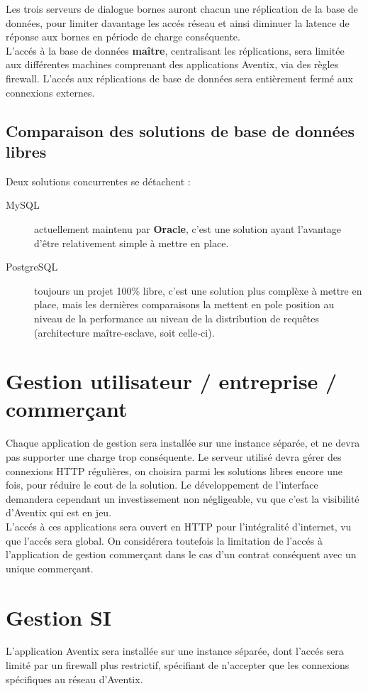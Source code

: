 Les trois serveurs de dialogue bornes auront chacun une réplication de la base
de données, pour limiter davantage les accés réseau et ainsi diminuer la
latence de réponse aux bornes en période de charge conséquente. \\

L'accés à la base de données \textbf{maître}, centralisant les réplications,
sera limitée aux différentes machines comprenant des applications Aventix, via
des règles firewall. L'accés aux réplications de base de données sera
entièrement fermé aux connexions externes.

\subsection{Comparaison des solutions de base de données libres}

Deux solutions concurrentes se détachent :

\begin{description}
  \item[MySQL] actuellement maintenu par \textbf{Oracle}, c'est une solution
    ayant l'avantage d'être relativement simple à mettre en place.
  \item[PostgreSQL] toujours un projet 100\% libre, c'est une solution plus
    complèxe à mettre en place, mais les dernières comparaisons la mettent en
    pole position au niveau de la performance au niveau de la distribution de
    requêtes (architecture maître-esclave, soit celle-ci).
\end{description}

\section{Gestion utilisateur / entreprise / commerçant}

Chaque application de gestion sera installée sur une instance séparée, et ne
devra pas supporter une charge trop conséquente. Le serveur utilisé devra gérer
des connexions HTTP régulières, on choisira parmi les solutions libres encore
une fois, pour réduire le cout de la solution. Le développement de l'interface
demandera cependant un investissement non négligeable, vu que c'est la
visibilité d'Aventix qui est en jeu. \\

L'accés à ces applications sera ouvert en HTTP pour l'intégralité d'internet,
vu que l'accés sera global. On considérera toutefois la limitation de l'accés à
l'application de gestion commerçant dans le cas d'un contrat conséquent avec un
unique commerçant.

\section{Gestion SI}

L'application Aventix sera installée sur une instance séparée, dont l'accés
sera limité par un firewall plus restrictif, spécifiant de n'accepter que les
connexions spécifiques au réseau d'Aventix.


